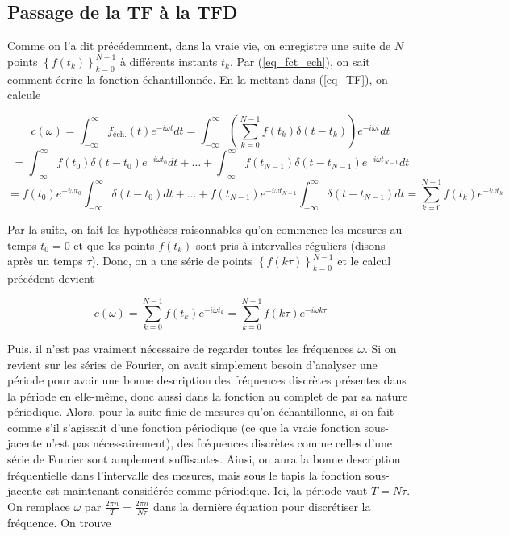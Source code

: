 \subsection{Passage de la TF à la TFD}
Comme on l'a dit précédemment, dans la vraie vie, on enregistre une suite de $N$ points $\left\{f(t_k)\right\}_{k=0}^{N-1}$ à différents instants $t_k$. Par (\ref{eq_fct_ech}), on sait comment écrire la fonction échantillonnée. En la mettant dans (\ref{eq_TF}), on calcule 

\begin{equation*}
    c(\omega) = \int_{-\infty}^{\infty}f_{\text{éch.}}(t)e^{-i\omega t}dt = \int_{-\infty}^{\infty}\left(\sum_{k=0}^{N-1}f(t_k)\delta(t-t_k)\right)e^{-i\omega t}dt 
\end{equation*}
\begin{equation*}
    = \int_{-\infty}^{\infty}f(t_0)\delta(t-t_0)e^{-i\omega t_0}dt + \dots + \int_{-\infty}^{\infty}f(t_{N-1})\delta(t-t_{N-1})e^{-i\omega t_{N-1}}dt 
\end{equation*}
\begin{equation*}
    = f(t_0)e^{-i\omega t_0}\int_{-\infty}^{\infty}\delta(t-t_0)dt + \dots + f(t_{N-1})e^{-i\omega t_{N-1}}\int_{-\infty}^{\infty}\delta(t-t_{N-1})dt = \sum_{k=0}^{N-1}f(t_k)e^{-i\omega t_k}
\end{equation*}

Par la suite, on fait les hypothèses raisonnables qu'on commence les mesures au temps $t_0 = 0$ et que les points $f(t_k)$ sont pris à intervalles réguliers (disons après un temps $\tau$). Donc, on a une série de points $\left\{f(k\tau)\right\}_{k=0}^{N-1}$ et le calcul précédent devient

\begin{equation*}
    c(\omega) = \sum_{k=0}^{N-1}f(t_k)e^{-i\omega t_k} = \sum_{k=0}^{N-1}f(k\tau)e^{-i\omega k\tau}
\end{equation*}

Puis, il n'est pas vraiment nécessaire de regarder toutes les fréquences $\omega$. Si on revient sur les séries de Fourier, on avait simplement besoin d'analyser une période pour avoir une bonne description des fréquences discrètes présentes dans la période en elle-même, donc aussi dans la fonction au complet de par sa nature périodique. Alors, pour la suite finie de mesures qu'on échantillonne, si on fait comme s'il s'agissait d'une fonction périodique (ce que la vraie fonction sous-jacente n'est pas nécessairement), des fréquences discrètes comme celles d'une série de Fourier sont amplement suffisantes. Ainsi, on aura la bonne description fréquentielle dans l'intervalle des mesures, mais sous le tapis la fonction sous-jacente est maintenant considérée comme périodique. Ici, la période vaut $T = N\tau$. On remplace $\omega$ par $\frac{2\pi n}{T} = \frac{2\pi n}{N\tau}$ dans la dernière équation pour discrétiser la fréquence. On trouve 

